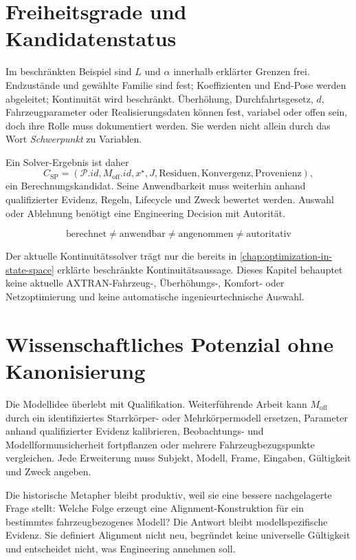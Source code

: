 \section{Freiheitsgrade und Kandidatenstatus}

Im beschränkten Beispiel sind \(L\) und \(\alpha\) innerhalb erklärter Grenzen
frei. Endzustände und gewählte Familie sind fest; Koeffizienten und End-Pose
werden abgeleitet; Kontinuität wird beschränkt. Überhöhung,
Durchfahrtsgesetz, \(d\), Fahrzeugparameter oder Realisierungsdaten können
fest, variabel oder offen sein, doch ihre Rolle muss dokumentiert werden. Sie
werden nicht allein durch das Wort \emph{Schwerpunkt} zu Variablen.

Ein Solver-Ergebnis ist daher
\[
C_{\mathrm{SP}}=
(\mathcal P.id,M_{\mathrm{off}}.id,x^\star,J,
\text{Residuen},\text{Konvergenz},\text{Provenienz}),
\]
ein Berechnungskandidat. Seine Anwendbarkeit muss weiterhin anhand
qualifizierter Evidenz, Regeln, Lifecycle und Zweck bewertet werden. Auswahl
oder Ablehnung benötigt eine Engineering Decision mit Autorität.

\[
\boxed{\text{berechnet}
\neq\text{anwendbar}
\neq\text{angenommen}
\neq\text{autoritativ}}
\]

Der aktuelle Kontinuitätssolver trägt nur die bereits in
\cref{chap:optimization-in-state-space} erklärte beschränkte
Kontinuitätsaussage. Dieses Kapitel behauptet keine aktuelle AXTRAN-Fahrzeug-,
Überhöhungs-, Komfort- oder Netzoptimierung und keine automatische
ingenieurtechnische Auswahl.

\section{Wissenschaftliches Potenzial ohne Kanonisierung}

Die Modellidee überlebt mit Qualifikation. Weiterführende Arbeit kann
\(M_{\mathrm{off}}\) durch ein identifiziertes Starrkörper- oder
Mehrkörpermodell ersetzen, Parameter anhand qualifizierter Evidenz kalibrieren,
Beobachtungs- und Modellformunsicherheit fortpflanzen oder mehrere
Fahrzeugbezugspunkte vergleichen. Jede Erweiterung muss Subjekt, Modell,
Frame, Eingaben, Gültigkeit und Zweck angeben.

Die historische Metapher bleibt produktiv, weil sie eine bessere
nachgelagerte Frage stellt: Welche Folge erzeugt eine Alignment-Konstruktion
für ein bestimmtes fahrzeugbezogenes Modell? Die Antwort bleibt
modellspezifische Evidenz. Sie definiert Alignment nicht neu, begründet keine
universelle Gültigkeit und entscheidet nicht, was Engineering annehmen soll.
